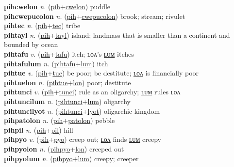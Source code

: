\textbf{pihcwelon} \textit{n.} (\hyperref[pih]{pih}+\hyperref[cwelon]{cwelon})
puddle \label{pihcwelon} \\
\textbf{pihcwepucolon} \textit{n.} (\hyperref[pih]{pih}+\hyperref[cwepucolon]{cwepucolon})
brook; stream; rivulet \label{pihcwepucolon} \\
\textbf{pihtec} \textit{n.} (\hyperref[pih]{pih}+\hyperref[tec]{tec})
tribe \label{pihtec} \\
\textbf{pihtayl} \textit{n.} (\hyperref[pih]{pih}+\hyperref[tayl]{tayl})
island; landmass that is smaller than a continent and bounded by ocean \label{pihtayl} \\
\textbf{pihtafu} \textit{v.} (\hyperref[pih]{pih}+\hyperref[tafu]{tafu})
itch; ʟᴏᴧ’s \hyperref[pihtafulum]{ʟᴜᴍ} itches \label{pihtafu} \\
\textbf{pihtafulum} \textit{n.} (\hyperref[pihtafu]{pihtafu}+\hyperref[lum]{lum})
itch \label{pihtafulum} \\
\textbf{pihtue} \textit{v.} (\hyperref[pih]{pih}+\hyperref[tue]{tue})
be poor; be destitute; \hyperref[pihtuelon]{ʟᴏᴧ} is financially poor \label{pihtue} \\
\textbf{pihtuelon} \textit{n.} (\hyperref[pihtue]{pihtue}+\hyperref[lon]{lon})
poor; destitute \label{pihtuelon} \\
\textbf{pihtunci} \textit{v.} (\hyperref[pih]{pih}+\hyperref[tunci]{tunci})
rule as an oligarchy; \hyperref[pihtuncilum]{ʟᴜᴍ} rules ʟᴏᴧ \label{pihtunci} \\
\textbf{pihtuncilum} \textit{n.} (\hyperref[pihtunci]{pihtunci}+\hyperref[lum]{lum})
oligarchy \label{pihtuncilum} \\
\textbf{pihtuncilyot} \textit{n.} (\hyperref[pihtunci]{pihtunci}+\hyperref[lyot]{lyot})
oligarchic kingdom \label{pihtuncilyot} \\
\textbf{pihpatolon} \textit{n.} (\hyperref[pih]{pih}+\hyperref[patolon]{patolon})
pebble \label{pihpatolon} \\
\textbf{pihpil} \textit{n.} (\hyperref[pih]{pih}+\hyperref[pil]{pil})
hill \label{pihpil} \\
\textbf{pihpyo} \textit{v.} (\hyperref[pih]{pih}+\hyperref[pyo]{pyo})
creep out; \hyperref[pihpyolon]{ʟᴏᴧ} finds \hyperref[pihpyolum]{ʟᴜᴍ} creepy \label{pihpyo} \\
\textbf{pihpyolon} \textit{n.} (\hyperref[pihpyo]{pihpyo}+\hyperref[lon]{lon})
creeped out \label{pihpyolon} \\
\textbf{pihpyolum} \textit{n.} (\hyperref[pihpyo]{pihpyo}+\hyperref[lum]{lum})
creepy; creeper \label{pihpyolum} \\
